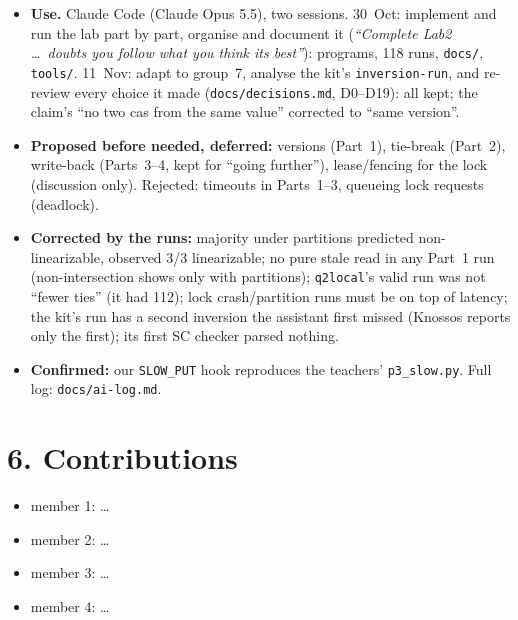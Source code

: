 \documentclass[a4paper,10pt]{article}
\begin{document}
\begin{itemize}
\item \textbf{Use.} Claude Code (Claude Opus 5.5), two sessions. 30~Oct:
  implement and run the lab part by part, organise and document it
  (\emph{``Complete Lab2 \dots\ doubts you follow what you think its
  best''}): programs, 118 runs, \texttt{docs/}, \texttt{tools/}. 11~Nov:
  adapt to group~7, analyse the kit's \texttt{inversion-run}, and re-review
  every choice it made (\texttt{docs/decisions.md}, D0--D19): all kept;
  the claim's ``no two cas from the same value'' corrected to ``same
  version''.
\item \textbf{Proposed before needed, deferred:} versions (Part~1),
  tie-break (Part~2), write-back (Parts~3--4, kept for ``going
  further''), lease/fencing for the lock (discussion only). Rejected:
  timeouts in Parts~1--3, queueing lock requests (deadlock).
\item \textbf{Corrected by the runs:} majority under partitions predicted
  non-linearizable, observed 3/3 linearizable; no pure stale read in any
  Part~1 run (non-intersection shows only with partitions);
  \texttt{q2local}'s valid run was not ``fewer ties'' (it had 112); lock
  crash/partition runs must be on top of latency; the kit's run has a
  second inversion the assistant first missed (Knossos reports only the
  first); its first SC checker parsed nothing.
\item \textbf{Confirmed:} our \texttt{SLOW\_PUT} hook reproduces the
  teachers' \texttt{p3\_slow.py}. Full log: \texttt{docs/ai-log.md}.
\end{itemize}

\section*{6. Contributions}

\begin{itemize}
\item member 1: \dots
\item member 2: \dots
\item member 3: \dots
\item member 4: \dots
\end{itemize}
\end{document}
